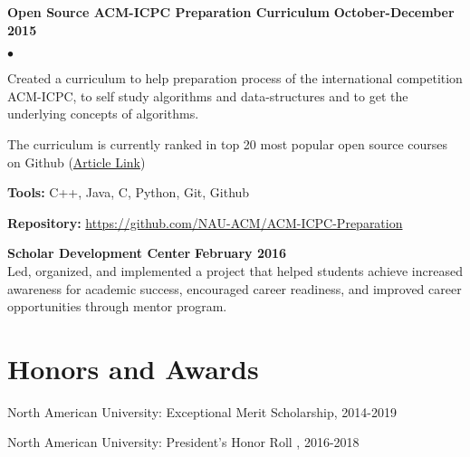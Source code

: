 \documentclass[margin,line]{res}
\newenvironment{list2}{
  \begin{list}{$\bullet$}{%
      \setlength{\itemsep}{0in}
      \setlength{\parsep}{0in} \setlength{\parskip}{0in}
      \setlength{\topsep}{0in} \setlength{\partopsep}{0in} 
      \setlength{\leftmargin}{0.2in}}}{\end{list}}
\begin{document}
\begin{resume}
{\bf Open Source ACM-ICPC Preparation Curriculum} \hfill {\bf October-December 2015}\\
\vspace{-.3cm}
\begin{list2}
\item Created a curriculum to help preparation process of the international competition ACM-ICPC, to self study algorithms and data-structures and to get the underlying concepts of algorithms.
\item The curriculum is currently ranked in top 20 most popular open source courses on Github (\href{https://education.github.community/t/20-of-the-most-popular-courses-on-github/27832}{Article Link})
\item \textbf{Tools:} C++, Java, C, Python, Git, Github
\item \textbf{Repository:} \href{https://github.com/NAU-ACM/ACM-ICPC-Preparation}{https://github.com/NAU-ACM/ACM-ICPC-Preparation}
\end{list2}

{\bf Scholar Development Center} \hfill {\bf February  2016}\\
Led, organized, and implemented a project that helped students achieve increased awareness for academic success, encouraged
career readiness, and improved career opportunities through mentor program.


\section{\sc Honors and Awards}

North American University: Exceptional Merit Scholarship, 2014-2019

\vspace*{-2.5mm}
North American University: President's Honor Roll , 2016-2018



\end{resume}
\end{document}
